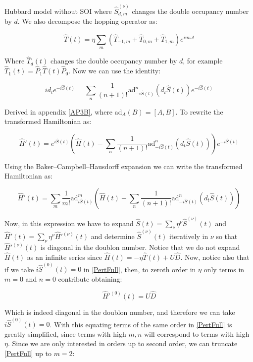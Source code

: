 \begin{section}{Hubbard model without SOI}
where $\hat{S}^{(\nu)}_{d,m}$ changes the double occupancy number by $d$. We also decompose the hopping operator as:

\begin{equation}
\hat{T}(t) = \eta \sum_m (\hat{T}_{-1,m}+\hat{T}_{0,m}+\hat{T}_{1,m})e^{im\omega t}
\end{equation}

Where $\hat{T}_d(t)$ changes the double occupancy number by $d$, for example $\hat{T}_1(t) = \hat{P}_1 \hat{T}(t) \hat{P}_0$. Now we can use the identity:

\begin{equation}
id_t e^{-i\hat{S}(t)} = \sum_n \frac{1}{(n+1)!}\text{ad}_{-i\hat{S}(t)}^n (d_t \hat{S}(t))e^{-i\hat{S}(t)}
\end{equation}

Derived in appendix \ref{AP3B}, where $\text{ad}_A(B) = [A,B]$. To rewrite the transformed Hamiltonian as:

\begin{equation}
\hat{H}'(t) = e^{i\hat{S}(t)} \left( \hat{H}(t) - \sum_n \frac{1}{(n+1)!}\text{ad}_{-i\hat{S}(t)}^n (d_t \hat{S}(t)) \right) e^{-i\hat{S}(t)}
\end{equation}

Using the Baker–Campbell–Hausdorff expansion we can write the transformed Hamiltonian as:

\begin{equation}
\label{PertFull}
\hat{H}'(t) = \sum_m \frac{1}{m!} \text{ad}_{i\hat{S}(t)}^m \left( \hat{H}(t) - \sum_n \frac{1}{(n+1)!}\text{ad}_{-i\hat{S}(t)}^n (d_t \hat{S}(t)) \right)
\end{equation}

Now, in this expression we have to expand $\hat{S}(t) = \sum_\nu \eta^\nu \hat{S}^{(\nu)}(t)$ and $\hat{H}'(t) = \sum_\nu \eta^\nu \hat{H}'^{(\nu)}(t)$ and determine $\hat{S}^{(\nu)}(t)$ iteratively in $\nu$ so that $\hat{H}'^{(\nu)}(t)$ is diagonal in the doublon number. Notice that we do not expand $\hat{H}(t)$ as an infinite series since $\hat{H}(t) = -\eta \hat{T}(t) + U\hat{D}$. Now, notice also that if we take $i\hat{S}^{(0)}(t)=0$ in \ref{PertFull}, then, to zeroth order in $\eta$ only terms in $m=0$ and $n=0$ contribute obtaining:

\begin{equation}
\hat{H}'^{(0)}(t) = U\hat{D}
\end{equation}

Which is indeed diagonal in the doublon number, and therefore we can take $i\hat{S}^{(0)}(t)=0$. With this equating terms of the same order in \ref{PertFull} is greatly simplified, since terms with high $m,n$ will correspond to terms with high $\eta$. Since we are only interested in orders up to second order, we can truncate \ref{PertFull} up to $m=2$:


\end{section}
